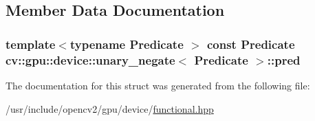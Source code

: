 \subsection{Member Data Documentation}
\hypertarget{structcv_1_1gpu_1_1device_1_1unary__negate_a89c8a6a102d64d1654ff6faea0783bb9}{
\subsubsection[{pred}]{\setlength{\rightskip}{0pt plus 5cm}template$<$typename Predicate $>$ const Predicate {\bf cv\-::gpu\-::device\-::unary\-\_\-negate}$<$ Predicate $>$\-::pred}}\label{structcv_1_1gpu_1_1device_1_1unary__negate_a89c8a6a102d64d1654ff6faea0783bb9}


The documentation for this struct was generated from the following file\-:\begin{DoxyCompactItemize}
\item 
/usr/include/opencv2/gpu/device/\hyperlink{functional_8hpp}{functional.\-hpp}\end{DoxyCompactItemize}
